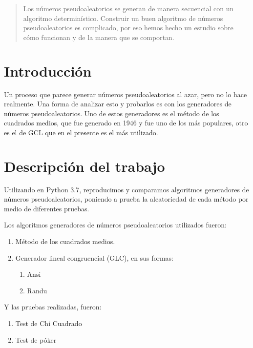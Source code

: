 \begin{abstract}
Los números pseudoaleatorios se generan de manera secuencial con un algoritmo determinístico. Construir un buen algoritmo de números pseudoaleatorios es complicado, por eso hemos hecho un estudio sobre cómo funcionan y de la manera que se comportan.
\end{abstract}




\section{Introducción}
Un proceso que parece generar números pseudoaleatorios al azar, pero no lo hace realmente. Una forma de analizar esto y probarlos es con los generadores de números pseudoaleatorios. Uno de estos generadores es el método de los cuadrados medios, que fue generado en 1946 y fue uno de los más populares, otro es el de GCL que en el presente es el más utilizado.



\section{Descripción del trabajo}
    Utilizando en Python 3.7, reproducimos y comparamos algoritmos generadores de números pseudoaleatorios, poniendo a prueba
    la aleatoriedad de cada método por medio de diferentes pruebas.

    Los algoritmos generadores de números pseudoaleatorios utilizados fueron:
\begin{enumerate}
    \item Método de los cuadrados medios.
    \item Generador lineal congruencial (GLC), en sus formas:
    \begin{enumerate}
        \item Ansi
        \item Randu
    \end{enumerate}
\end{enumerate}
    Y las pruebas realizadas, fueron:
\begin{enumerate}
    \item Test de Chi Cuadrado
    \item Test de póker
\end{enumerate}


